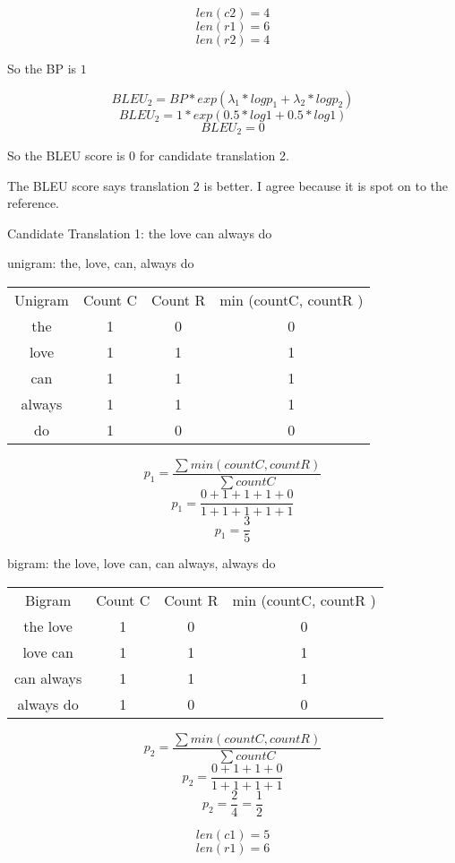 \documentclass[11pt,largemargins]{homework}
\begin{document}
$$len(c2) = 4$$
$$len(r1) = 6$$
$$len(r2) = 4$$

So the BP is $1$

$$BLEU_2 = BP * exp(\lambda_1 * log p_1 + \lambda_2 * log p_2) $$  
$$BLEU_2 = 1 * exp(0.5 * log 1 + 0.5 * log 1) $$  
$$BLEU_2 = 0 $$

So the BLEU score is $0$ for candidate translation 2.


The BLEU score says translation 2 is better. I agree because it is spot on to the reference. 


\question

Candidate Translation 1: the love can always do


unigram: the, love, can, always do

\begin{center}
\begin{tabular}{ |c|c|c|c| }
 \hline
   Unigram & Count C & Count R & min (countC, countR ) \\
   the & 1 & 0 & 0 \\
   love & 1 & 1 & 1 \\ 
   can & 1 & 1 & 1 \\
   always & 1 & 1 & 1 \\
   do & 1 & 0 & 0 \\
 \hline
\end{tabular}
\end{center}

$$ p_1 = \frac{\sum min (countC, countR)}{ \sum countC } $$
$$ p_1 = \frac{0 + 1 + 1 + 1 + 0}{ 1 + 1 + 1 + 1 + 1 } $$
$$ p_1 = \frac{3}{5} $$

bigram: the love, love can, can always, always do

\begin{center}
\begin{tabular}{ |c|c|c|c| }
 \hline
   Bigram & Count C & Count R & min (countC, countR ) \\
   the love & 1 & 0 & 0 \\
   love can & 1 & 1 & 1 \\ 
   can always & 1 & 1 & 1 \\
   always do & 1 & 0 & 0 \\
 \hline
\end{tabular}
\end{center}

$$ p_2 = \frac{\sum min (countC, countR)}{ \sum countC } $$
$$ p_2 = \frac{0 + 1 + 1 + 0}{ 1 + 1 + 1 + 1 } $$
$$ p_2 = \frac{2}{4} = \frac{1}{2} $$


$$len(c1) = 5$$
$$len(r1) = 6$$
\end{document}
